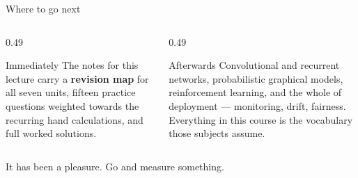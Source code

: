 \documentclass[aspectratio=169]{beamer}
\begin{document}
\begin{frame}{Where to go next}
  \begin{columns}[T]
    \begin{column}{0.49\textwidth}
      \begin{block}{Immediately}
        The notes for this lecture carry a \textbf{revision map} for all
        seven units, fifteen practice questions weighted towards the
        recurring hand calculations, and full worked solutions.
      \end{block}
    \end{column}
    \begin{column}{0.49\textwidth}
      \begin{block}{Afterwards}
        Convolutional and recurrent networks, probabilistic graphical models,
        reinforcement learning, and the whole of deployment --- monitoring,
        drift, fairness. Everything in this course is the vocabulary those
        subjects assume.
      \end{block}
    \end{column}
  \end{columns}
  \vspace{0.6em}
  \begin{center}
    \large It has been a pleasure. Go and measure something.
  \end{center}
  \slidesources{\AMLPrescribed}
\end{frame}
\end{document}
